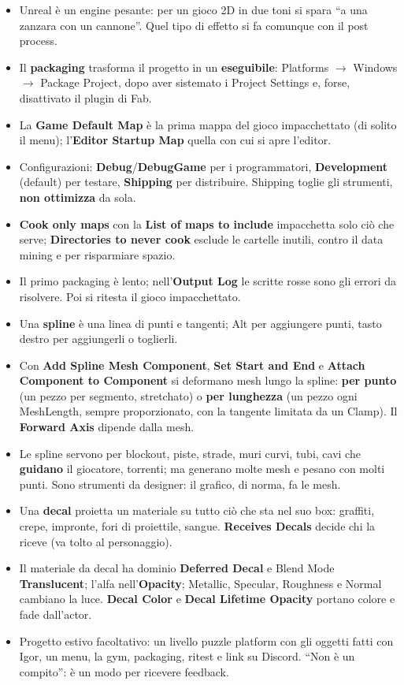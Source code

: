 \begin{itemize}
        Highlights, ognuno con Saturation, Contrast, Gamma, Gain e Offset. Si impara solo
        sperimentando.
  \item Unreal è un engine pesante: per un gioco 2D in due toni si spara ``a una zanzara con un
        cannone''. Quel tipo di effetto si fa comunque con il post process.
  \item Il \textbf{packaging} trasforma il progetto in un \textbf{eseguibile}: Platforms
        $\rightarrow$ Windows $\rightarrow$ Package Project, dopo aver sistemato i Project
        Settings e, forse, disattivato il plugin di Fab.
  \item La \textbf{Game Default Map} è la prima mappa del gioco impacchettato (di solito il
        menu); l'\textbf{Editor Startup Map} quella con cui si apre l'editor.
  \item Configurazioni: \textbf{Debug}/\textbf{DebugGame} per i programmatori,
        \textbf{Development} (default) per testare, \textbf{Shipping} per distribuire.
        Shipping toglie gli strumenti, \textbf{non ottimizza} da sola.
  \item \textbf{Cook only maps} con la \textbf{List of maps to include} impacchetta solo ciò che
        serve; \textbf{Directories to never cook} esclude le cartelle inutili, contro il data
        mining e per risparmiare spazio.
  \item Il primo packaging è lento; nell'\textbf{Output Log} le scritte rosse sono gli errori da
        risolvere. Poi si ritesta il gioco impacchettato.
  \item Una \textbf{spline} è una linea di punti e tangenti; Alt per aggiungere punti, tasto
        destro per aggiungerli o toglierli.
  \item Con \textbf{Add Spline Mesh Component}, \textbf{Set Start and End} e \textbf{Attach
        Component to Component} si deformano mesh lungo la spline: \textbf{per punto} (un pezzo
        per segmento, stretchato) o \textbf{per lunghezza} (un pezzo ogni MeshLength, sempre
        proporzionato, con la tangente limitata da un Clamp). Il \textbf{Forward Axis} dipende
        dalla mesh.
  \item Le spline servono per blockout, piste, strade, muri curvi, tubi, cavi che
        \textbf{guidano} il giocatore, torrenti; ma generano molte mesh e pesano con molti punti.
        Sono strumenti da designer: il grafico, di norma, fa le mesh.
  \item Una \textbf{decal} proietta un materiale su tutto ciò che sta nel suo box: graffiti,
        crepe, impronte, fori di proiettile, sangue. \textbf{Receives Decals} decide chi la
        riceve (va tolto al personaggio).
  \item Il materiale da decal ha dominio \textbf{Deferred Decal} e Blend Mode
        \textbf{Translucent}; l'alfa nell'\textbf{Opacity}; Metallic, Specular, Roughness e
        Normal cambiano la luce. \textbf{Decal Color} e \textbf{Decal Lifetime Opacity} portano
        colore e fade dall'actor.
  \item Progetto estivo facoltativo: un livello puzzle platform con gli oggetti fatti con Igor,
        un menu, la gym, packaging, ritest e link su Discord. ``Non è un compito'': è un modo per
        ricevere feedback.
\end{itemize}

